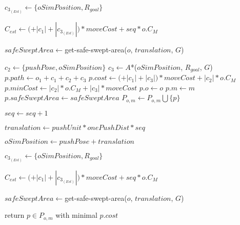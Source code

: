 \begin{algorithm}[H]
\begin{algorithmic}[1]
        \State $c_{3_{(Est)}} \gets \{oSimPosition, R_{goal}\}$

        \State $C_{est} \gets ($$ + |c_{1}| + |c_{3_{(Est)}}|) * moveCost + seq * o.C_{M}$

        \State $safeSweptArea \gets $get-safe-swept-area($o$, $translation$, $G$)


            \State $c_{2} \gets \{pushPose, oSimPosition\}$
            \State $c_{3} \gets A$*($oSimPosition$, $R_{goal}$, $G$)
            \State $p.path \gets o_{1} + c_{1} + c_{2} + c_{3}$
            \State $p.cost \gets ($$ + |c_{1}| + |c_{3}|) * moveCost + |c_{2}| * o.C_{M}$
            \State $p.minCost \gets |c_{2}| * o.C_{M} + |c_{3}| * moveCost$
            \State $p.o \gets o$
            \State $p.m \gets m$
            \State $p.safeSweptArea \gets safeSweptArea$
            \State $P_{o,m} \gets P_{o,m} \bigcup \{p\}$
          \EndIf

          \State $seq \gets seq + 1$

          \State $translation \gets pushUnit * onePushDist * seq$

          \State $oSimPosition \gets pushPose + translation$

          \State $c_{3_{(Est)}} \gets \{oSimPosition, R_{goal}\}$

          \State $C_{est} \gets ($$ + |c_{1}| + |c_{3_{(Est)}}|) * moveCost + seq * o.C_{M}$

          \State $safeSweptArea \gets $get-safe-swept-area($o$, $translation$, $G$)

        \EndWhile

      \EndFor

    \State return $p \in P_{o,m}$ with minimal $p.cost$

    \EndProcedure

  \end{algorithmic}
\end{algorithm}
